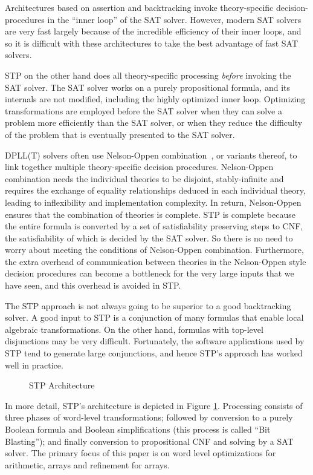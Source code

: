 Architectures based on assertion and backtracking invoke
theory-specific decision-procedures in the ``inner loop'' of the SAT
solver.  However, modern SAT solvers are very fast largely because of
the incredible efficiency of their inner loops, and so it is difficult
with these architectures to take the best advantage of fast SAT
solvers.

STP on the other hand does all theory-specific processing {\em
before\/} invoking the SAT solver.  The SAT solver works on a purely
propositional formula, and its internals are not modified, including
the highly optimized inner loop.  Optimizing transformations are
employed before the SAT solver when they can solve a problem more
efficiently than the SAT solver, or when they reduce the difficulty of
the problem that is eventually presented to the SAT solver.

DPLL(T) solvers often use Nelson-Oppen combination~\cite{nelsonoppen},
or variants thereof, to link together multiple theory-specific
decision procedures. Nelson-Oppen combination needs the individual
theories to be disjoint, stably-infinite and requires the exchange of
equality relationships deduced in each individual theory, leading to
inflexibility and implementation complexity.  In return, Nelson-Oppen
ensures that the combination of theories is complete. STP is complete
because the entire formula is converted by a set of satisfiability
preserving steps to CNF, the satisfiability of which is decided by the
SAT solver.  So there is no need to worry about meeting the conditions
of Nelson-Oppen combination. Furthermore, the extra overhead of
communication between theories in the Nelson-Oppen style decision
procedures can become a bottleneck for the very large inputs that we
have seen, and this overhead is avoided in STP.

The STP approach is not always going to be superior to a good
backtracking solver.  A good input to STP is a conjunction of many
formulas that enable local algebraic transformations.  On the other
hand, formulas with top-level disjunctions may be very
difficult. Fortunately, the software applications used by STP tend to
generate large conjunctions, and hence STP's approach has worked well
in practice.


\begin{figure}
\center
\epsfysize=1.5in
\epsfxsize=3in
\caption{STP Architecture}
\label{stparch}
\end{figure}

In more detail, STP's architecture is depicted in Figure
\ref{stparch}.  Processing consists of three phases of word-level
transformations; followed by conversion to a purely Boolean formula
and Boolean simplifications (this process is called ``Bit Blasting'');
and finally conversion to propositional CNF and solving by a SAT
solver.  The primary focus of this paper is on word level
optimizations for arithmetic, arrays and refinement for arrays.

